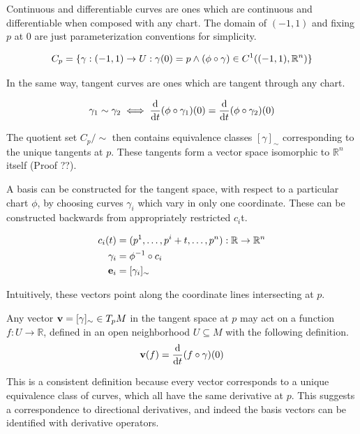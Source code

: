 Continuous and differentiable curves are ones which are continuous and differentiable when composed with any chart. The domain of $(-1, 1)$ and fixing $p$ at 0 are just parameterization conventions for simplicity.

\begin{equation}
	C_{p} = \{ \gamma : (-1, 1) \rightarrow U : \gamma(0) = p \land (\phi \circ \gamma) \in C^{1} ((-1, 1), \mathbb{R}^{n}) \} \\
\end{equation}

In the same way, tangent curves are ones which are tangent through any chart.

\begin{equation}
	\gamma_{1} \sim \gamma_{2} \iff \dv{t}(\phi \circ \gamma_{1}) (0) = \dv{t}(\phi \circ \gamma_{2}) (0)
\end{equation}

The quotient set $C_{p} / \sim$ then contains equivalence classes $[ \gamma ]_{\sim}$ corresponding to the unique tangents at $p$. These tangents form a vector space isomorphic to $\mathbb{R}^{n}$ itself (Proof ??).

A basis can be constructed for the tangent space, with respect to a particular chart $\phi$, by choosing curves $\gamma_{i}$ which vary in only one coordinate. These can be constructed backwards from appropriately restricted $c_{i}$t.

\begin{align*}
	c_{i}(t) &= (p^{1}, \dots, p^{i} + t, \dots, p^{n}) : \mathbb{R} \rightarrow \mathbb{R}^{n} \\
	\gamma_{i} &= \phi^{-1} \circ c_{i} \\
	\vb{e}_{i}& = [\gamma_{i}]_{\sim}
\end{align*}

Intuitively, these vectors point along the coordinate lines intersecting at $p$.

\begin{definition}
	Any vector $\vb{v} = [\gamma]_{\sim} \in T_{p} M$ in the tangent space at $p$ may act on a function $f: U \rightarrow \mathbb{R}$, defined in an open neighborhood $U \subseteq M$ with the following definition.
	\begin{equation}
		\vb{v}(f) = \dv{t} (f \circ \gamma)(0)
	\end{equation}
\end{definition}

This is a consistent definition because every vector corresponds to a unique equivalence class of curves, which all have the same derivative at $p$. This suggests a correspondence to directional derivatives, and indeed the basis vectors can be identified with derivative operators.

